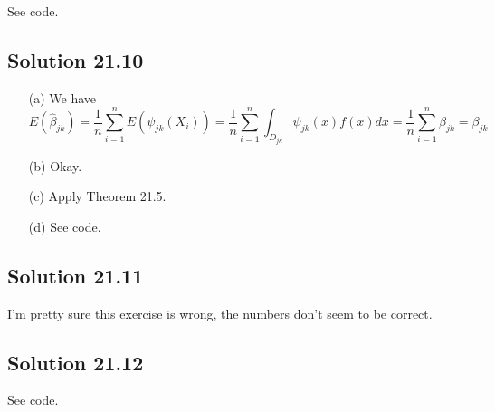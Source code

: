 See code.


\subsection*{Solution 21.10}

\begin{enumerate}
    \item[(a)] We have
        \begin{equation*}
            E(\hat{\beta}_{jk}) = \frac{1}{n} \sum_{i = 1}^n E(\psi_{jk}(X_i))
                = \frac{1}{n} \sum_{i = 1}^n \int_{D_{jk}} \psi_{jk}(x) f(x) dx
                = \frac{1}{n} \sum_{i = 1}^n \beta_{jk}
                = \beta_{jk}
        \end{equation*}
    \item[(b)] Okay.
    \item[(c)] Apply Theorem 21.5.
    \item[(d)] See code.
\end{enumerate}


\subsection*{Solution 21.11}

I'm pretty sure this exercise is wrong, the numbers don't seem to be correct.


\subsection*{Solution 21.12}

See code.
